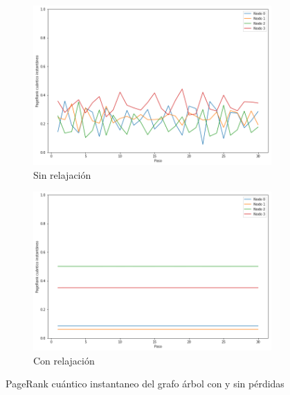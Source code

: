 \begin{figure}[H]
    \centering
    \begin{subfigure}[m]{0.45\textwidth}
        \centering
        \includegraphics[width=0.9\linewidth]{img/tree-inst-lossless.png}
        \caption{Sin relajación}
    \end{subfigure}
    \begin{subfigure}[m]{0.45\textwidth}
        \centering
        \includegraphics[width=0.9\linewidth]{img/tree-inst-lossy.png}
        \caption{Con relajación}
    \end{subfigure}
    \caption[PageRank cuántico instantaneo del grafo árbol con y sin pérdidas]{PageRank cuántico instantaneo del grafo árbol con y sin pérdidas}
    \label{fig:insttreelossy}
\end{figure}

